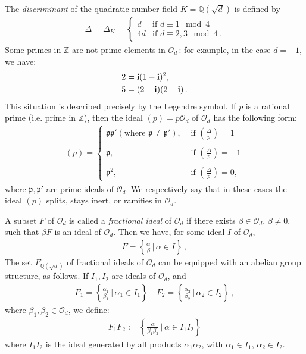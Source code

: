 \documentclass[reqno]{amsart}
\theoremstyle{plain}
\theoremstyle{definition}
\theoremstyle{remark}
\numberwithin{equation}{section}
\begin{document}
The {\em discriminant} of the quadratic number field $K={{\mathbb Q}}(\sqrt d)$
is defined by
\begin{align*}
  \Delta = \Delta_K = \left\{
  \begin{array}{ll}
    d & \text{if } d\equiv 1\mod 4\\
    4d & \text{if } d\equiv 2,3\mod 4\,.
  \end{array}\right.
\end{align*}
Some primes in ${{\mathbb Z}}$ are not prime elements in ${{\mathcal O}}_d$\,: for example,
in the case $d=-1$, we have:
\begin{align*}
  2 &= {{\bf i}}(1-{{\bf i}})^2,\\
  5 &= (2+{{\bf i}})(2-{{\bf i}})\,.
\end{align*}
This situation is described precisely by the Legendre symbol. If $p$
is a rational prime (i.e. prime in ${{\mathbb Z}}$), then the ideal
$(p) = p{{\mathcal O}}_d$ of ${{\mathcal O}}_d$ has the following form: 
\begin{align*}
  (p) = \left\{
  \begin{array}{ll}
    \mathfrak{p} \mathfrak{p}' (\text{where }\mathfrak{p}\neq\mathfrak{p}'), &
                                 \text{ if } \displaystyle\left(\frac{\Delta}{p}\right)=1\\
    \,\\
    \mathfrak{p},  & \text{ if } \displaystyle\left(\frac{\Delta}{p}\right)=-1\\
    \,\\
    \mathfrak{p}^2,  & \text{ if } \displaystyle\left(\frac{\Delta}{p}\right)=0,
  \end{array}\right.
\end{align*}
where $\mathfrak{p}, \mathfrak{p}'$ are prime ideals of ${{\mathcal O}}_d$. We
respectively say that in these cases the ideal $(p)$ splits, stays
inert, or ramifies in ${{\mathcal O}}_d$.

A subset $F$ of ${{\mathcal O}}_d$ is called a {\em fractional ideal} of
${{\mathcal O}}_d$ if there exists $\beta\in{{\mathcal O}}_d$, $\beta\neq 0$, such that
$\beta F$ is an ideal of ${{\mathcal O}}_d$. Then we have, for some
ideal $I$ of ${{\mathcal O}}_d$,
\begin{align*}
  F = \left\{ \frac{\alpha}{\beta}\,\bigg|\, \alpha\in I\right\}\,,
\end{align*}
The set $F_{{{\mathbb Q}}(\sqrt d)}$ of fractional ideals of ${{\mathcal O}}_d$ can be
equipped with an abelian group structure, as follows. If $I_1,I_2$ are ideals
of ${{\mathcal O}}_d$, and
\begin{align*}
  F_1 = \left\{ \frac{\alpha_1}{\beta_1}\,\bigg|\, \alpha_1\in I_1\right\}\quad
  F_2 = \left\{ \frac{\alpha_2}{\beta_2}\,\bigg|\, \alpha_2\in I_2\right\}\,,
\end{align*}
where $\beta_1,\beta_2\in{{\mathcal O}}_d$, we define:
\begin{align*}
  F_1F_2 := \left\{ \frac{\alpha}{\beta_1\beta_2}\,\bigg|\, \alpha\in I_1I_2\right\}
\end{align*}
where $I_1I_2$ is the ideal generated by all products
$\alpha_1\alpha_2$, with $\alpha_1\in I_1$, $\alpha_2\in I_2$.
\end{document}
